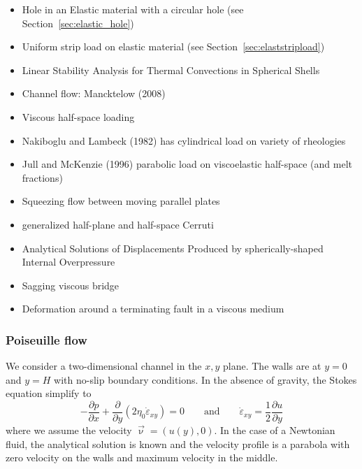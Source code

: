 \begin{itemize}
\item Hole in an Elastic material with a circular hole (see Section~\ref{sec:elastic_hole})
\item Uniform strip load on elastic material (see Section~\ref{sec:elaststripload})
\item Linear Stability Analysis for Thermal Convections in Spherical Shells \cite{yuwa19}
\item Channel flow: Mancktelow (2008) \cite{manc08}
\item Viscous half-space loading \cite{hask35}
\item Nakiboglu and Lambeck (1982) has cylindrical load on variety of rheologies \cite{nala82}
\item Jull and McKenzie (1996) \cite{jumc96} parabolic load on viscoelastic half-space (and melt fractions) 
\item Squeezing flow between moving parallel plates \cite{gugu77}
\item generalized half-plane and half-space Cerruti \cite{nowi92,zhga15}
\item Analytical Solutions of Displacements Produced by spherically-shaped Internal Overpressure \cite{gech12}
\item Sagging viscous bridge \cite{stokes98}
\item Deformation around a terminating fault in a viscous medium \cite{baho96}
\end{itemize}


\subsubsection{Poiseuille flow} \label{ss:poiseuille}

We consider a two-dimensional channel in the $x,y$ plane. The walls 
are at $y=0$ and $y=H$ with no-slip boundary conditions. 
In the absence of gravity, the Stokes equation simplify to 
\begin{equation}
-\frac{\partial p}{\partial x}  +\frac{\partial }{\partial y} (2\eta_0 \dot{\varepsilon}_{xy}) =0
\qquad
\text{and}
\qquad
\dot{\varepsilon}_{xy} = \frac{1}{2} \frac{\partial u}{\partial y} 
\label{eq:pois1}
\end{equation}
where we assume the velocity $\vec\upnu=(u(y),0)$.
In the case of a Newtonian fluid, the analytical solution is 
known and the velocity profile is a parabola with zero velocity on the
walls and maximum velocity in the middle. 


